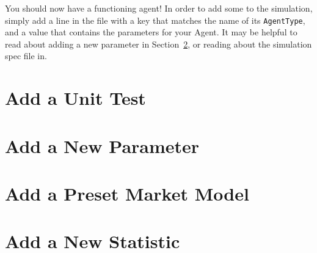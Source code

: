 \documentclass[11pt]{article}
\begin{document}
You should now have a functioning agent! In order to add some to the simulation,
simply add a line in the  file with a key that
matches the name of its \texttt{AgentType}, and a value that contains the
parameters for your Agent. It may be helpful to read about adding a new
parameter in Section~\ref{sec:new_param}, or reading about the simulation spec
file in. %

\section{Add a Unit Test}

\section{Add a New Parameter} \label{sec:new_param}

\section{Add a Preset Market Model}

\section{Add a New Statistic}
\end{document}
